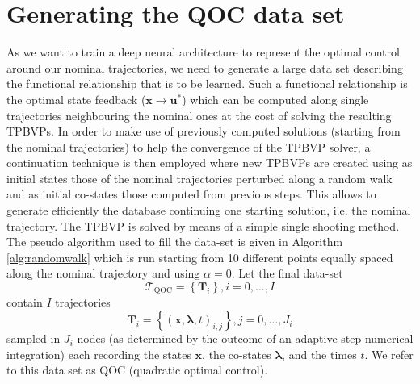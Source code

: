 \documentclass[graybox]{svmult}
\begin{document}
\section {Generating the QOC data set}
As we want to train a deep neural architecture to represent the optimal control around our nominal trajectories, we need to generate a large data set describing the functional relationship that is to be learned. Such a functional relationship is the optimal state feedback ($\mathbf x \to \mathbf u^*$) which can be computed along single trajectories neighbouring the nominal ones at the cost of solving the resulting TPBVPs.
In order to make use of previously computed solutions (starting from the nominal trajectories) to help the convergence of the TPBVP solver, a continuation technique is then employed where new TPBVPs are created using as initial states those of the nominal trajectories perturbed along a random walk and as initial co-states those computed from previous steps. This allows to generate efficiently the database continuing one starting solution, i.e. the nominal trajectory. The TPBVP is solved by means of a simple single shooting method. The pseudo algorithm used to fill the data-set is given in Algorithm \ref{alg:randomwalk} which is run starting from 10 different points equally spaced along the nominal trajectory and using $\alpha = 0$. Let the final data-set
\begin{equation}\label{eq:database}
\mathcal{T}_{\mbox{QOC}} = \left\{\mathbf{T}_i\right\},  i = 0,\dots,I
\end{equation}
contain $I$ trajectories
\begin{equation}\label{eq:trajectory}
\mathbf{T}_{i} = \left\{(\mathbf{x}, \boldsymbol{\lambda}, t)_{i,j}\right\},  j = 0, \dots, J_i
\end{equation}
sampled in $J_i$ nodes (as determined by the outcome of an adaptive step numerical integration) 
each recording the states $\mathbf{x}$, the co-states $\boldsymbol{\lambda}$, and the times $t$. We refer to this data set as QOC (quadratic optimal control).




\end{document}
